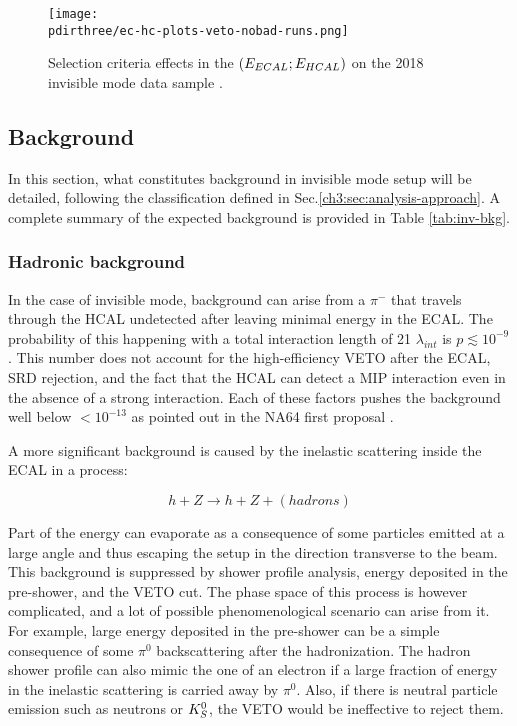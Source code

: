 \begin{figure}[bth!]
  \centering
   \texttt{[image: \\pdirthree/ec-hc-plots-veto-nobad-runs.png]}
  \caption[Effect of the cuts in invisible mode]{Selection criteria effects in the $(E_{ECAL};E_{HCAL})$ on the 2018 invisible mode data sample \cite{invis-cut-plot,NA64:2019imj}.}
  \label{fig:inv-cut-ehcal}
\end{figure}

\subsection{Background}
\label{ch3:sec:bkg:inv}

In this section, what constitutes background in invisible mode setup will be detailed, following the classification defined in Sec.\ref{ch3:sec:analysis-approach}. A complete summary of the expected background is provided in Table \ref{tab:inv-bkg}.
\subsubsection{Hadronic background}
\label{ch3:sec:bkg:inv:hadr}


In the case of invisible mode, background can arise from a $\pi^-$ that travels through the HCAL undetected after leaving minimal energy in the ECAL. The probability of this happening with a total interaction length of 21 $\lambda_{int}$ is $p\lesssim 10^{-9}$. This number does not account for the high-efficiency VETO after the ECAL, SRD rejection, and the fact that the HCAL can detect a MIP interaction even in the absence of a strong interaction. Each of these factors pushes the background well below $<10^{-13}$ as pointed out in the NA64 first proposal \cite{Andreas:2013lya}.

A more significant background is caused by the inelastic scattering inside the ECAL in a process:

\begin{equation}
  \label{eq:pion-nucleus-scattering}
  h + Z \longrightarrow h + Z + (hadrons)
\end{equation}

Part of the energy can evaporate as a consequence of some particles emitted at a large angle and thus escaping the setup in the direction transverse to the beam. This background is suppressed by shower profile analysis, energy deposited in the pre-shower, and the VETO cut. The phase space of this process is however complicated, and a lot of possible phenomenological scenario can arise from it. For example, large energy deposited in the pre-shower can be a simple consequence of some $\pi^0$ backscattering after the hadronization. The hadron shower profile can also mimic the one of an electron if a large fraction of energy in the inelastic scattering is carried away by $\pi^0$. Also, if there is neutral particle emission such as neutrons or $K^0_S$, the VETO would be ineffective to reject them.

